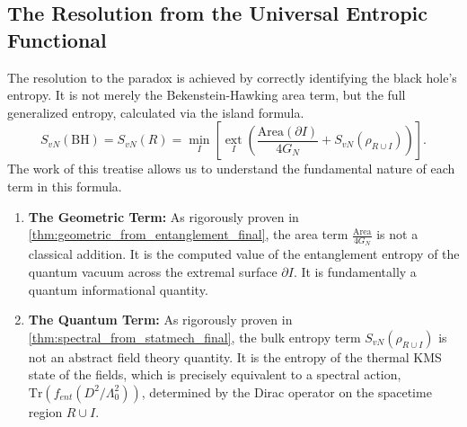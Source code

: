 \documentclass[11pt, letterpaper]{report}
\theoremstyle{plain} %
\theoremstyle{definition} %
\theoremstyle{remark} %
\begin{document}
\subsection{The Resolution from the Universal Entropic Functional}
The resolution to the paradox is achieved by correctly identifying the black hole's entropy. It is not merely the Bekenstein-Hawking area term, but the full generalized entropy, calculated via the island formula.
\begin{equation}
    S_{vN}(\text{BH}) = S_{vN}(R) = \min_{I} \left[ \operatorname*{ext}_{I} \left( \frac{\text{Area}(\partial I)}{4G_N} + S_{vN}(\rho_{R \cup I}) \right) \right].
\end{equation}
The work of this treatise allows us to understand the fundamental nature of each term in this formula.
\begin{enumerate}
    \item \textbf{The Geometric Term:} As rigorously proven in \cref{thm:geometric_from_entanglement_final}, the area term $\frac{\text{Area}}{4G_N}$ is not a classical addition. It is the computed value of the entanglement entropy of the quantum vacuum across the extremal surface $\partial I$. It is fundamentally a quantum informational quantity.

    \item \textbf{The Quantum Term:} As rigorously proven in \cref{thm:spectral_from_statmech_final}, the bulk entropy term $S_{vN}(\rho_{R \cup I})$ is not an abstract field theory quantity. It is the entropy of the thermal KMS state of the fields, which is precisely equivalent to a spectral action, $\text{Tr}(f_{ent}(D^2/\Lambda_0^2))$, determined by the Dirac operator on the spacetime region $R \cup I$.
\end{enumerate}
\end{document}
